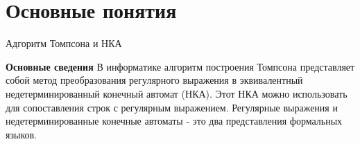 \section{Основные понятия}
\begin{frame}{Адгоритм Томпсона и НКА}
    \vspace{-5pt}
    \begin{block}{\bf Основные сведения}
        В информатике алгоритм построения Томпсона представляет собой метод преобразования регулярного выражения в эквивалентный недетерминированный конечный автомат (НКА). Этот НКА можно использовать для сопоставления строк с регулярным выражением.
        Регулярные выражения и недетерминированные конечные автоматы - это два представления формальных языков.
    \end{block}
\end{frame}%

